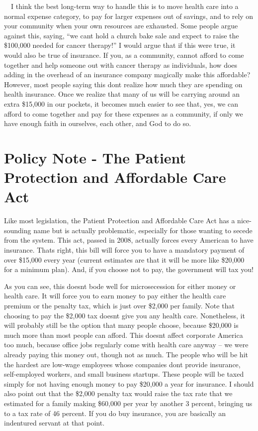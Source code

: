 \ \ I think the best long-term way to handle this is to move health care
into a normal expense category, to pay for larger expenses out of
savings, and to rely on your community when your own resources are
exhausted.  Some people argue against this, saying, “we
can{\textquotesingle}t hold a church bake sale and expect to raise the
\$100,000 needed for cancer therapy!”  I would argue that if this were
true, it would also be true of insurance.  If you, as a community,
cannot afford to come together and help someone out with cancer therapy
as individuals, how does adding in the overhead of an insurance company
magically make this affordable?  However, most people saying this
don{\textquotesingle}t realize how much they are spending on health
insurance.  Once we realize that many of us will be carrying around an
extra \$15,000 in our pockets, it becomes much easier to see that, yes,
we can afford to come together and pay for these expenses as a
community, if only we have enough faith in ourselves, each other, and
God to do so.

\section{Policy Note - The Patient Protection and Affordable Care Act}

Like most legislation, the Patient Protection and Affordable Care Act
has a nice-sounding name but is
actually problematic,
especially for those wanting to secede from the system. This act,
passed in 2008, actually forces every American to have insurance.
That{\textquotesingle}s right, this bill will force you to have a
mandatory payment of over \$15,000 every year (current estimates are
that it will be more like \$20,000 for a minimum plan). And, if you
choose not to pay, the government will tax you!  


As you can see, this doesn{\textquotesingle}t bode well for
microsecession for either money or health care. It will force you to
earn money to pay either the health care premium or the penalty tax,
which is just over \$2,000 per family. Note that choosing to pay the
\$2,000 tax doesn{\textquotesingle}t give you any health care. 
Nonetheless, it will probably still be the option that many people
choose, because \$20,000 is much more than most people can afford. 
This doesn{\textquotesingle}t affect corporate America too much,
because office jobs regularly come with health care anyway – we were
already paying this money out, though not as much.  The people who will
be hit the hardest are low-wage employees whose companies
don{\textquotesingle}t provide insurance, self-employed workers, and
small business startups.  These people will be taxed simply for not
having enough money to pay \$20,000 a year for insurance.  I should
also point out that the \$2,000 penalty tax would raise the tax rate
that we estimated for a family making \$60,000 per year by another 3
percent, bringing us to a tax rate of 46 percent. If you do buy
insurance, you are basically an indentured servant at that point.


